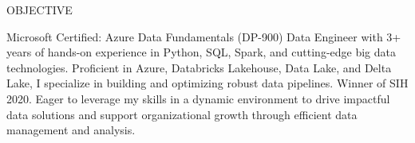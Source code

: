 \documentclass{resume} %
\begin{document}

\begin{rSection}{OBJECTIVE}

{Microsoft Certified: Azure Data Fundamentals (DP-900) Data Engineer with 3+ years of hands-on experience in Python, SQL, Spark, and cutting-edge big data technologies. Proficient in Azure, Databricks Lakehouse, Data Lake, and Delta Lake, I specialize in building and optimizing robust data pipelines. Winner of SIH 2020. Eager to leverage my skills in a dynamic environment to drive impactful data solutions and support organizational growth through efficient data management and analysis.}


\end{rSection}
\end{document}
